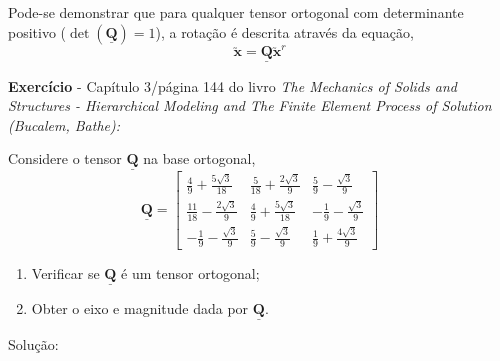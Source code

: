 	Pode-se demonstrar que para qualquer tensor ortogonal com determinante positivo ($\det(\underline{\mathbf{Q}})=1$), a rotação é descrita através da equação,
	\[\utilde{\mathbf{x}}=\underline{\mathbf{Q}}\utilde{\mathbf{x}}^r\]
	
	\textbf{Exercício} - Capítulo 3/página 144 do livro \textit{The Mechanics of Solids and Structures - Hierarchical Modeling and The Finite Element Process of Solution (Bucalem, Bathe):}
	
	Considere o tensor $\underline{\mathbf{Q}}$ na base ortogonal,
	\[
		\underline{\mathbf{Q}}
		=
		\begin{bmatrix}
			\frac{4}{9}+\frac{5\sqrt{3}}{18} & \frac{5}{18}+\frac{2\sqrt{3}}{9} & \frac{5}{9}-\frac{\sqrt{3}}{9} \\
			\frac{11}{18}-\frac{2\sqrt{3}}{9} & \frac{4}{9}+\frac{5\sqrt{3}}{18} & -\frac{1}{9}-\frac{\sqrt{3}}{9} \\
			-\frac{1}{9}-\frac{\sqrt{3}}{9} & \frac{5}{9}-\frac{\sqrt{3}}{9} & \frac{1}{9}+\frac{4\sqrt{3}}{9}
		\end{bmatrix}
	\]
	
	\begin{enumerate}
		\item Verificar se $\underline{\mathbf{Q}}$ é um tensor ortogonal;
		\item Obter o eixo e magnitude dada por $\underline{\mathbf{Q}}$.
	\end{enumerate}
	
	Solução:
	
